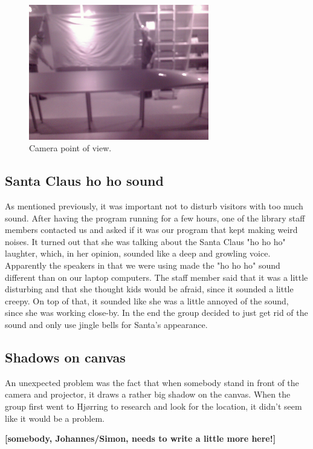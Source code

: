 \begin{figure}[htbp]
\centering
\includegraphics[width=0.70\textwidth]{Pictures/Design/IR_pic}
\caption{Camera point of view.}
\label{fig:camera_POV}
\end{figure}

\subsection{Santa Claus ho ho sound}
As mentioned previously, it was important not to disturb visitors with too much sound. After having the program running for a few hours, one of the library staff members contacted us and asked if it was our program that kept making weird noises. It turned out that she was talking about the Santa Claus "ho ho ho" laughter, which, in her opinion, sounded like a deep and growling voice. Apparently the speakers in that we were using made the "ho ho ho" sound different than on our laptop computers. The staff member said that it was a little disturbing and that she thought kids would be afraid, since it sounded a little creepy. On top of that, it sounded like she was a little annoyed of the sound, since she was working close-by.
In the end the group decided to just get rid of the sound and only use jingle bells for Santa's appearance.

\subsection{Shadows on canvas}
An unexpected problem was the fact that when somebody stand in front of the camera and projector, it draws a rather big shadow on the canvas. When the group first went to Hj{\o}rring to research and look for the location, it didn't seem like it would be a problem.

\textbf{[somebody, Johannes/Simon, needs to write a little more here!]}

